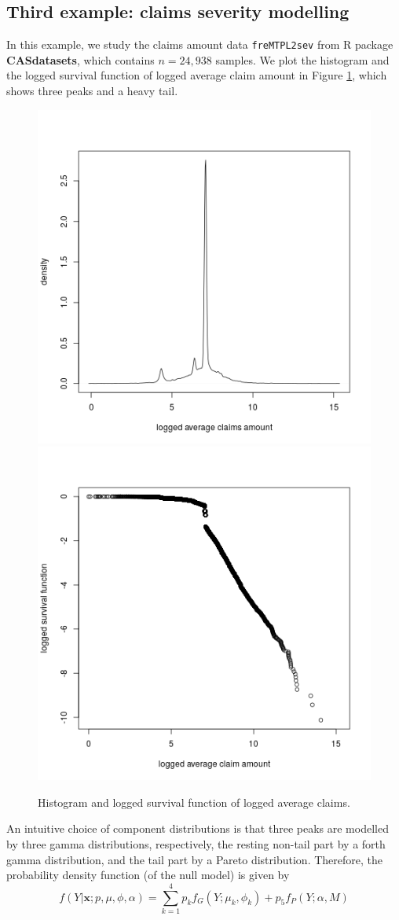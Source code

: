 \documentclass[11pt]{article}
\numberwithin{equation}{section}
\def\bx{\boldsymbol{x}}
\begin{document}
\subsection{Third example: claims severity modelling}\label{sec:third example}
In this example, we study the claims amount data {\tt freMTPL2sev} from R package {\bf CASdatasets}, which contains $n=24,938$ samples. 
We plot the histogram and the logged survival function of logged average claim  amount in Figure \ref{tail}, which shows three peaks and a heavy tail. 
	\begin{figure}[h!]
		\centering
		\includegraphics[width=0.45\linewidth]{../plots/sev/hist.png}
		\includegraphics[width=0.45\linewidth]{../plots/sev/log-log.png}
		\caption{Histogram and logged survival function of logged average claims.}\label{tail}
	\end{figure}
An intuitive choice of component distributions is that 
three peaks are modelled by three gamma distributions, respectively, the resting non-tail part by a forth gamma distribution, and the tail part by a Pareto distribution.
Therefore, the probability density function (of the null model) is given by
\begin{equation}\label{sev-0}
	f(Y|\bx;p,\mu,\phi,\alpha)=\sum_{k=1}^4p_kf_{G}(Y;\mu_k,\phi_k)+p_5f_{P}(Y;\alpha,M)
\end{equation}
\end{document}
